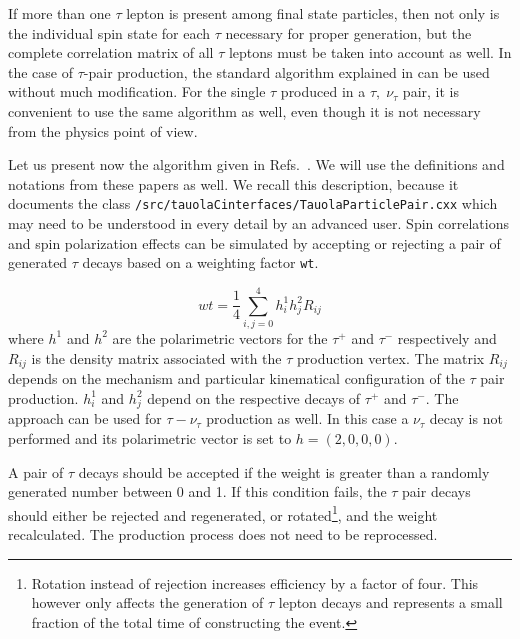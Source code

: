 \documentclass[]{Tauola_interface_design}
\begin{document}
If more than one $\tau$ lepton is present among final state particles, then not only is the individual
spin state for each $\tau$ 
necessary for  proper generation, but the complete correlation matrix
of all $\tau$ leptons must be taken into account  as well. In the case 
of $\tau$-pair production,  the standard algorithm explained 
in \cite{Jadach:1990mz,Jadach:1993hs}
can be used  without much modification. 
For the single $\tau$ produced in a $\tau,\;\nu_\tau$ pair,
it is convenient to use the same algorithm as well, 
even though it is not necessary from the physics point of view. 


Let us present now the algorithm given in  
Refs.~\cite{Jadach:1990mz,Jadach:1993hs}. We will
use the definitions and notations from these papers as well.
We recall this description, because it documents the class {\tt /src/tauolaCinterfaces/TauolaParticlePair.cxx} which may need to be understood in every detail by an advanced user.
Spin correlations and spin polarization effects can be  simulated by accepting or rejecting 
a pair of generated $\tau$ decays based on a weighting factor {\tt wt}.

\begin{equation}
wt=\displaystyle \frac{1}{4} \sum_{i,j=0}^{4} h^1_i h^2_j R_{ij} 
\label{weight}
\end{equation}
where $h^1$ and $h^2$ are the polarimetric vectors
for the $\tau^+$ and $\tau^-$ respectively and $R_{ij}$ is the 
density matrix associated with the $\tau$ production vertex. 
 The matrix  $R_{ij}$ depends on the mechanism 
and particular kinematical configuration of
the $\tau$ pair production. $h^1_i$ and $h^2_j$ depend on the respective 
decays of $\tau^+$ and $\tau^-$.  
The approach can be used for $\tau-\nu_{\tau}$ production as well.
In this case a $\nu_{\tau}$ decay is not performed and its polarimetric vector is set to $h=(2,0,0,0)$.


A pair of $\tau$ decays should be accepted if the weight is greater than
a randomly generated number between 0 and 1.
If this condition fails, the $\tau$ pair decays should either be rejected and
regenerated, or rotated\footnote{Rotation instead of rejection increases 
efficiency by a factor of four. This however only affects the generation of $\tau$ 
lepton decays and represents a small fraction of the total time of
constructing the event.},
and the weight recalculated. The production process does not need to be 
reprocessed.
\end{document}

